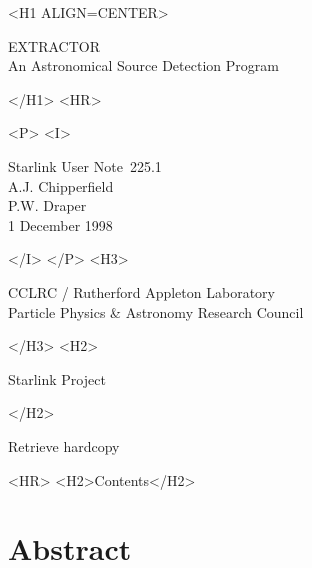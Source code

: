 \documentclass[twoside,11pt]{article}
\newcommand{\stardoccategory}  {Starlink User Note}
\newcommand{\stardocsource}    {sun\stardocnumber}
\newcommand{\stardocnumber}    {225.1}
\newcommand{\stardocauthors}   {A.J. Chipperfield\\
                                P.W. Draper}
\newcommand{\stardocdate}      {1 December 1998}
\newcommand{\stardoctitle}     {EXTRACTOR\\
                                An Astronomical Source Detection Program}
\newcommand{\htmladdnormallink}[2]{#1}
\newcommand{\htmladdimg}[1]{}
\newcommand{\htmlref}[2]{#1}
\newcommand{\htmladdtonavigation}[1]{}
\newcommand{\xlabel}[1]{}
\renewcommand{\_}{\texttt{\symbol{95}}}
\begin{document}
\begin{htmlonly}
   \xlabel{}
   \begin{rawhtml} <H1 ALIGN=CENTER> \end{rawhtml}
      \stardoctitle
   \begin{rawhtml} </H1> <HR> \end{rawhtml}

   \begin{center}
     \htmladdimg{sun225fig.gif}
   \end{center}

   \begin{rawhtml} <P> <I> \end{rawhtml}
   \stardoccategory\ \stardocnumber \\
   \stardocauthors \\
   \stardocdate
   \begin{rawhtml} </I> </P> <H3> \end{rawhtml}
      \htmladdnormallink{CCLRC}{http://www.cclrc.ac.uk} /
      \htmladdnormallink{Rutherford Appleton Laboratory}
                        {http://www.cclrc.ac.uk/ral} \\
      \htmladdnormallink{Particle Physics \& Astronomy Research Council}
                        {http://www.pparc.ac.uk} \\
   \begin{rawhtml} </H3> <H2> \end{rawhtml}
      \htmladdnormallink{Starlink Project}{http://star-www.rl.ac.uk/}
   \begin{rawhtml} </H2> \end{rawhtml}
   \htmladdnormallink{\htmladdimg{source.gif} Retrieve hardcopy}
      {http://star-www.rl.ac.uk/cgi-bin/hcserver?\stardocsource}\\

  \label{stardoccontents}
  \begin{rawhtml}
    <HR>
    <H2>Contents</H2>
  \end{rawhtml}
  \htmladdtonavigation{\htmlref{\htmladdimg{contents_motif.gif}}
        {stardoccontents}}

  \section{\xlabel{abstract}Abstract}
\end{htmlonly}
\end{document}
